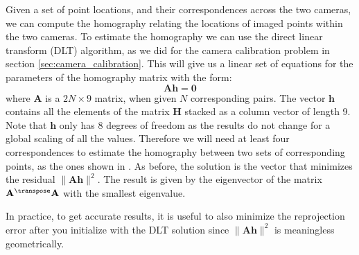 Given a set of point locations, and their correspondences across the two cameras, we can compute the homography relating the locations of imaged points within the two cameras.  To estimate the homography we can use the direct linear transform (DLT) algorithm, as we did for the camera calibration problem in section \ref{sec:camera_calibration}. This will give us a linear set of equations for the parameters of the homography matrix with the form:
\begin{equation}
\mathbf{A} \mathbf{h} = \mathbf{0}
\end{equation}
where $\mathbf{A}$ is a $2N \times 9$ matrix, when given $N$ corresponding pairs. The vector $\mathbf{h}$ contains all the elements of the matrix $\mathbf{H}$ stacked as a column vector of length 9. Note that $\mathbf{h}$ only has 8 degrees of freedom as the results do not change for a global scaling of all the values. Therefore we will need at least four correspondences to estimate the homography between two sets of corresponding points, as the ones shown in \fig{\ref{fig:fig_matching_two_images}}. As before, the solution is the vector that minimizes the residual $\|\mathbf{A} \mathbf{h} \|^2$. The result is given by the eigenvector of the matrix $\mathbf{A}^\transpose \mathbf{A}$ with the smallest eigenvalue.

In practice, to get accurate results, it is useful to also minimize the reprojection error after you initialize with the DLT solution since $\|\mathbf{A} \mathbf{h} \|^2$ is meaningless geometrically.



